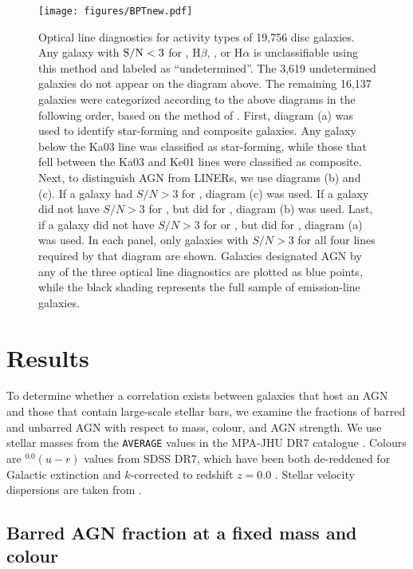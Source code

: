 \begin{figure*}
\texttt{[image: figures/BPTnew.pdf]}
\caption{Optical line diagnostics for activity types of 19,756 disc galaxies. Any galaxy with $\rm S/N < 3$ for , H$\beta$, , or H$\alpha$ is unclassifiable using this method and labeled as ``undetermined''. The 3,619 undetermined galaxies do not appear on the diagram above. The remaining 16,137 galaxies were categorized according to the above diagrams in the following order, based on the method of \citet{Schawinski2007}. First, diagram (a) was used to identify star-forming and composite galaxies. Any galaxy below the Ka03 line was classified as star-forming, while those that fell between the Ka03 and Ke01 lines were classified as composite. Next, to distinguish AGN from LINERs, we use diagrams (b) and (c). If a galaxy had $S/N > 3$ for , diagram (c) was used. If a galaxy did not have $S/N > 3$ for , but did for , diagram (b) was used. Last, if a galaxy did not have $S/N > 3$ for  or , but did for , diagram (a) was used. In each panel, only galaxies with $S/N > 3$ for all four lines required by that diagram are shown. Galaxies designated AGN by any of the three optical line diagnostics are plotted as blue points, while the black shading represents the full sample of emission-line galaxies.}
\label{BPT}
\end{figure*}
\section{Results}
\label{sec:Results}

To determine whether a correlation exists between galaxies that host an AGN and those that contain large-scale stellar bars, we examine the fractions of barred and unbarred AGN with respect to mass, colour, and AGN strength. We use stellar masses from the {\tt AVERAGE} values in the MPA-JHU DR7 catalogue \citep{Kauffmann2003}. Colours are $^{0.0}(u-r)$ values from SDSS DR7, which have been both de-reddened for Galactic extinction and $k$-corrected to redshift $z=0.0$ \citep{Csabai2003}. Stellar velocity dispersions are taken from \citet{Oh2011}.

\subsection{Barred AGN fraction at a fixed mass and colour}\label{ssec:barredfraction}
 
